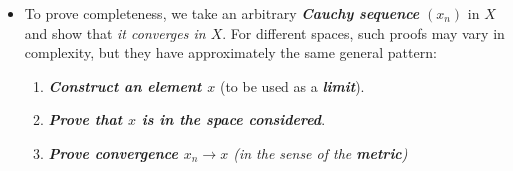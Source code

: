 \documentclass[11pt]{article}
\begin{document}
\begin{itemize}
\item \begin{remark}
To prove completeness, we take an arbitrary \emph{\textbf{Cauchy sequence}} $(x_n)$ in $X$ and show that \emph{it converges in $X$}. For different spaces, such proofs may vary in complexity, but they have approximately the same general pattern:
\begin{enumerate}
\item \emph{\textbf{Construct an element $x$}} (to be used as a \emph{\textbf{limit}}).
\item \emph{\textbf{Prove that $x$ is in the space considered}}.
\item \emph{\textbf{Prove convergence $x_n \rightarrow x$} (in the sense of the \textbf{metric})}
\end{enumerate}
\end{remark}


\end{itemize}
\end{document}
